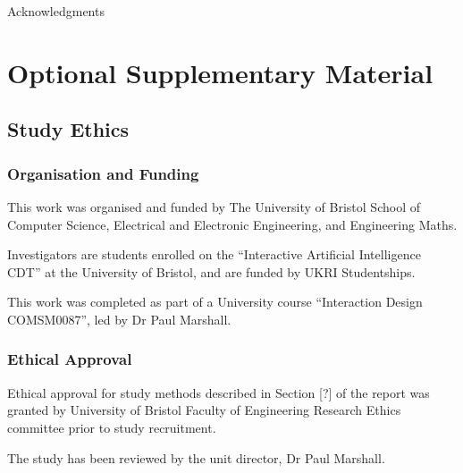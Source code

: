 \documentclass[manuscript,screen,review]{acmart}
\begin{document}
\begin{acks}
Acknowledgments
\end{acks}

\newpage



\appendix

\section{Optional Supplementary Material}

\subsection{Study Ethics}

\subsubsection{Organisation and Funding}


This work was organised and funded by The University of Bristol School of Computer Science, Electrical and Electronic Engineering, and Engineering Maths.

Investigators are students enrolled on the “Interactive Artificial Intelligence CDT” at the University of Bristol, and are funded by UKRI Studentships.

This work was completed as part of a University course “Interaction Design COMSM0087”, led by Dr Paul Marshall.


\subsubsection{Ethical Approval} 


Ethical approval for study methods described in Section [?] of the report was granted by University of Bristol Faculty of Engineering Research Ethics committee prior to study recruitment.

The study has been reviewed by the unit director, Dr Paul Marshall.
\end{document}
